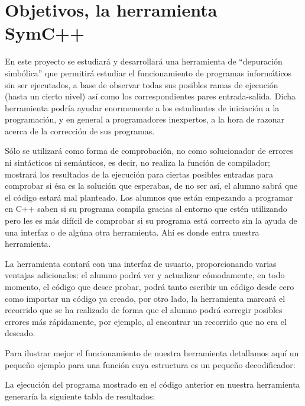 \section{Objetivos, la herramienta SymC++}

En este proyecto se estudiar\'a y desarrollar\'a una herramienta de ``depuraci\'on simb\'olica'' que permitir\'a estudiar el funcionamiento de programas inform\'aticos sin ser ejecutados, a base de observar todas sus posibles ramas de ejecuci\'on (hasta un cierto nivel) as\'i como los correspondientes pares entrada-salida. Dicha herramienta podr\'ia ayudar enormemente a los estudiantes de iniciaci\'on a la programaci\'on, y en general a programadores inexpertos, a la hora de razonar acerca de la correcci\'on de sus programas.

S\'olo se utilizar\'a como forma de comprobaci\'on, no como solucionador de errores ni sint\'acticos ni sem\'anticos, es decir, no realiza la funci\'on de compilador; mostrar\'a los resultados de la ejecuci\'on para ciertas posibles entradas para comprobar si \'esa es la soluci\'on que esperabas, de no ser as\'i, el alumno sabr\'a que el c\'odigo estar\'a mal planteado. Los alumnos que est\'an empezando a programar en C++ saben si su programa compila gracias al entorno que est\'en utilizando pero les es m\'as dif\'icil de comprobar si su programa est\'a correcto sin la ayuda de una interfaz o de alg\'una otra herramienta. Ah\'i es donde entra nuestra herramienta.

La herramienta contar\'a con una interfaz de usuario, proporcionando varias ventajas adicionales: el alumno podr\'a ver y actualizar c\'omodamente, en todo momento, el c\'odigo que desee probar, podr\'a tanto escribir un c\'odigo desde cero como importar un c\'odigo ya creado, por otro lado, la herramienta marcar\'a el recorrido que se ha realizado de forma que el alumno podr\'a corregir posibles errores m\'as r\'apidamente, por ejemplo, al encontrar un recorrido que no era el deseado.

Para ilustrar mejor el funcionamiento de nuestra herramienta detallamos aqu\'i un peque\~no ejemplo para una funci\'on cuya estructura es un peque\~no decodificador:



La ejecuci\'on del programa mostrado en el c\'odigo anterior en nuestra herramienta generar\'ia la siguiente tabla de resultados:

